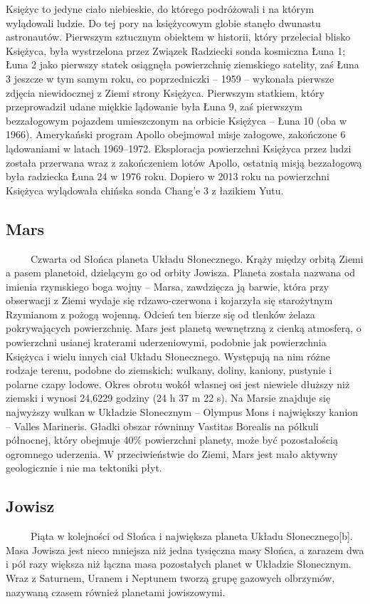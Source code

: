\documentclass[12pt, letterpaper, titlepage]{article}
\begin{document}
Księżyc to jedyne ciało niebieskie, do którego podróżowali i na którym wylądowali ludzie. Do tej pory na księżycowym globie stanęło dwunastu astronautów. Pierwszym sztucznym obiektem w historii, który przeleciał blisko Księżyca, była wystrzelona przez Związek Radziecki sonda kosmiczna Łuna 1; Łuna 2 jako pierwszy statek osiągnęła powierzchnię ziemskiego satelity, zaś Łuna 3 jeszcze w tym samym roku, co poprzedniczki – 1959 – wykonała pierwsze zdjęcia niewidocznej z Ziemi strony Księżyca. Pierwszym statkiem, który przeprowadził udane miękkie lądowanie była Łuna 9, zaś pierwszym bezzałogowym pojazdem umieszczonym na orbicie Księżyca – Łuna 10 (oba w 1966). Amerykański program Apollo obejmował misje załogowe, zakończone 6 lądowaniami w latach 1969–1972. Eksploracja powierzchni Księżyca przez ludzi została przerwana wraz z zakończeniem lotów Apollo, ostatnią misją bezzałogową była radziecka Łuna 24 w 1976 roku. Dopiero w 2013 roku na powierzchni Księżyca wylądowała chińska sonda Chang’e 3 z łazikiem Yutu.
\newpage
\subsection{Mars}
\ \ \ \ \ Czwarta od Słońca planeta Układu Słonecznego. Krąży między orbitą Ziemi a pasem planetoid, dzielącym go od orbity Jowisza. Planeta została nazwana od imienia rzymskiego boga wojny – Marsa, zawdzięcza ją barwie, która przy obserwacji z Ziemi wydaje się rdzawo-czerwona i kojarzyła się starożytnym Rzymianom z pożogą wojenną. Odcień ten bierze się od tlenków żelaza pokrywających powierzchnię. Mars jest planetą wewnętrzną z cienką atmosferą, o powierzchni usianej kraterami uderzeniowymi, podobnie jak powierzchnia Księżyca i wielu innych ciał Układu Słonecznego. Występują na nim różne rodzaje terenu, podobne do ziemskich: wulkany, doliny, kaniony, pustynie i polarne czapy lodowe. Okres obrotu wokół własnej osi jest niewiele dłuższy niż ziemski i wynosi 24,6229 godziny (24 h 37 m 22 s). Na Marsie znajduje się najwyższy wulkan w Układzie Słonecznym – Olympus Mons i największy kanion – Valles Marineris. Gładki obszar równinny Vastitas Borealis na półkuli północnej, który obejmuje 40\% powierzchni planety, może być pozostałością ogromnego uderzenia. W przeciwieństwie do Ziemi, Mars jest mało aktywny geologicznie i nie ma tektoniki płyt.
\newpage
\subsection{Jowisz}
\ \ \ \ \  Piąta w kolejności od Słońca i największa planeta Układu Słonecznego[b]. Masa Jowisza jest nieco mniejsza niż jedna tysięczna masy Słońca, a zarazem dwa i pół razy większa niż łączna masa pozostałych planet w Układzie Słonecznym. Wraz z Saturnem, Uranem i Neptunem tworzą grupę gazowych olbrzymów, nazywaną czasem również planetami jowiszowymi.
\end{document}

